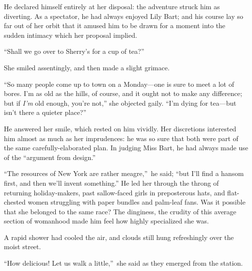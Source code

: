 \documentclass[12pt,a4paper]{book}
\begin{document}
He declared himself entirely at her disposal: the adventure
struck him as diverting. As a spectator, he had always enjoyed
Lily Bart; and his course lay so far out of her orbit that it
amused him to be drawn for a moment into the sudden intimacy
which her proposal implied.





``Shall we go over to Sherry's for a cup of tea?''





She smiled assentingly, and then made a slight grimace.





``So many people come up to town on a Monday---one is sure to meet
a lot of bores. I'm as old as the hills, of course, and it ought
not to make any difference; but if \textit{I'm} old enough, you're not,''
she objected gaily. ``I'm dying for tea---but isn't there a quieter
place?''





He answered her smile, which rested on him vividly. Her
discretions interested him almost as much as her imprudences: he
was so sure that both were part of the same carefully-elaborated
plan. In judging Miss Bart, he had always made use of the
``argument from design.''





``The resources of New York are rather meagre,''\ he said; ``but I'll
find a hansom first, and then we'll invent something.'' He led her
through the throng of returning holiday-makers, past sallow-faced
girls in preposterous hats, and flat-chested women struggling
with paper bundles and palm-leaf fans. Was it possible that she
belonged to the same race? The dinginess, the crudity of this
average section of womanhood made him feel how highly
specialized she was.





A rapid shower had cooled the air, and clouds still hung
refreshingly over the moist street.





``How delicious! Let us walk a little,''\ she said as they emerged
from the station.
\end{document}
